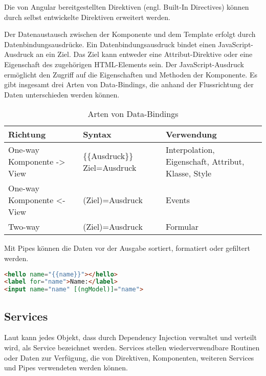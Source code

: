 Die von Angular bereitgestellten Direktiven (engl. Built-In Directives) können durch selbst entwickelte Direktiven erweitert werden. \autocite[vgl.][261]{Freeman.2018}

Der Datenaustausch zwischen der Komponente und dem Template erfolgt durch Datenbindungsausdrücke. Ein Datenbindungsausdruck bindet einen JavaScript-Ausdruck an ein Ziel. Das Ziel kann entweder eine Attribut-Direktive oder eine Eigenschaft des zugehörigen HTML-Elements sein. Der JavaScript-Ausdruck ermöglicht den Zugriff auf die Eigenschaften und Methoden der Komponente. \autocites[vgl.][237\psqq]{Freeman.2018}[vgl.][52\psq]{Steyer.2017} [vgl.][]{Google.d} Es gibt insgesamt drei Arten von Data-Bindings, die anhand der Flussrichtung der Daten unterschieden werden können. 

\begin{table}
\begin{tabular}{|>{\raggedright\arraybackslash}p{3cm}|>{\raggedright\arraybackslash}p{3.2cm}|>{\raggedright\arraybackslash}p{6.5cm}|}
	\hline
	\textbf{Richtung}&\textbf{Syntax}&\textbf{Verwendung}\\
	\hline 
	One-way Komponente -> View &\{\{Ausdruck\}\} \lbrack Ziel\rbrack =\dq Ausdruck\dq  & Interpolation, Eigenschaft, Attribut, Klasse, Style\\ 
	\hline 
	One-way Komponente <- View &(Ziel)=\dq Ausdruck\dq&Events\\ 
	\hline 
	Two-way&\lbrack (Ziel)\rbrack =\dq Ausdruck\dq&Formular\\ 
	\hline 
\end{tabular}
\caption{Arten von Data-Bindings}
\label{tab:DataBinding}
\end{table}

Mit Pipes können die  Daten vor der Ausgabe sortiert, formatiert oder gefiltert werden. \autocite[vgl.][83\psqq]{Steyer.2017}

\begin{lstlisting}[caption=Das Template in der Datei app.component.html, label=lst:AppComponentHTML, language=HTML]
<hello name="{{name}}"></hello>
<label for="name">Name:</label>
<input name="name" [(ngModel)]="name">
\end{lstlisting}

\subsection{Services}
Laut \textcite[vgl.][474]{Freeman.2018} kann jedes Objekt, dass durch Dependency Injection verwaltet und verteilt wird, als Service bezeichnet werden. Services stellen wiederverwendbare Routinen oder Daten zur Verfügung, die von Direktiven, Komponenten, weiteren Services und Pipes verwendeten werden können. \autocites[vgl.][467\psqq]{Freeman.2018}[vgl.][89]{Steyer.2017}

